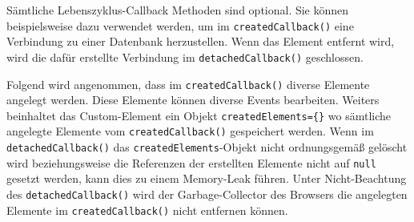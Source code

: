 Sämtliche Lebenszyklus-Callback Methoden sind optional. Sie können beispielsweise dazu verwendet werden, um im \lstinline|createdCallback()| eine Verbindung zu einer Datenbank herzustellen. Wenn das Element entfernt wird, wird die dafür erstellte Verbindung im \lstinline|detachedCallback()| geschlossen.

Folgend wird angenommen, dass im \lstinline|createdCallback()| diverse Elemente angelegt werden. Diese Elemente können diverse Events bearbeiten. Weiters beinhaltet das Custom-Element ein Objekt \lstinline|createdElements={}| wo sämtliche angelegte Elemente vom \lstinline|createdCallback()| gespeichert werden. Wenn im \lstinline|detachedCallback()| das \lstinline|createdElements|-Objekt nicht ordnungsgemäß gelöscht wird beziehungsweise die Referenzen der erstellten Elemente nicht auf \lstinline|null| gesetzt werden, kann dies zu einem Memory-Leak führen. Unter Nicht-Beachtung des \lstinline|detachedCallback()| wird der Garbage-Collector des Browsers die angelegten Elemente im \lstinline|createdCallback()| nicht entfernen können.